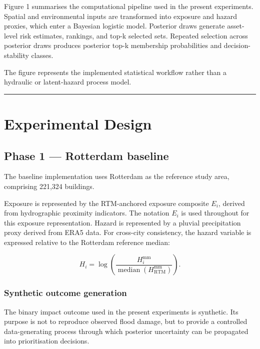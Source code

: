 \documentclass[
]{article}
\begin{document}
Figure 1 summarises the computational pipeline used in the present
experiments. Spatial and environmental inputs are transformed into
exposure and hazard proxies, which enter a Bayesian logistic model.
Posterior draws generate asset-level risk estimates, rankings, and top-k
selected sets. Repeated selection across posterior draws produces
posterior top-k membership probabilities and decision-stability classes.

The figure represents the implemented statistical workflow rather than a
hydraulic or latent-hazard process model.

\begin{center}\rule{0.5\linewidth}{0.5pt}\end{center}

\section{Experimental Design}\label{experimental-design}

\subsection{Phase 1 --- Rotterdam
baseline}\label{phase-1-rotterdam-baseline}

The baseline implementation uses Rotterdam as the reference study area,
comprising 221,324 buildings.

Exposure is represented by the RTM-anchored exposure composite \(E_i\),
derived from hydrographic proximity indicators. The notation \(E_i\) is
used throughout for this exposure representation. Hazard is represented
by a pluvial precipitation proxy derived from ERA5 data. For cross-city
consistency, the hazard variable is expressed relative to the Rotterdam
reference median:

\[
H_i
=
\log
\left(
\frac{H^{\mathrm{mm}}_i}
{\operatorname{median}(H^{\mathrm{mm}}_{\mathrm{RTM}})}
\right).
\]

\subsubsection{Synthetic outcome
generation}\label{synthetic-outcome-generation}

The binary impact outcome used in the present experiments is synthetic.
Its purpose is not to reproduce observed flood damage, but to provide a
controlled data-generating process through which posterior uncertainty
can be propagated into prioritisation decisions.
\end{document}
